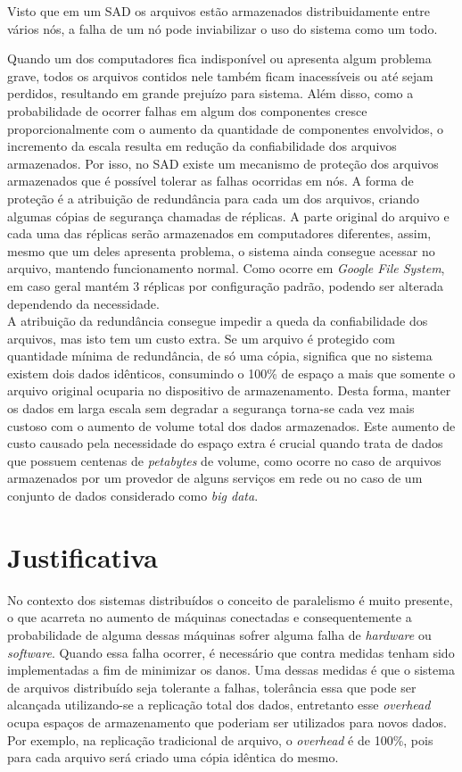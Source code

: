 	Visto que em um SAD os arquivos estão armazenados distribuidamente entre vários nós, a falha de um nó pode inviabilizar o uso do sistema como um todo.
	
	
	Quando um dos computadores fica indisponível ou apresenta algum problema grave, todos os arquivos contidos nele também ficam inacessíveis ou até sejam perdidos, resultando em grande prejuízo para sistema.
	Além disso, como a probabilidade de ocorrer falhas em algum dos componentes cresce proporcionalmente com o aumento da quantidade de componentes envolvidos, o incremento da escala resulta em redução da confiabilidade dos arquivos armazenados.
	Por isso, no SAD existe um mecanismo de proteção dos arquivos armazenados que é possível tolerar as falhas ocorridas em nós.
	A forma de proteção é a atribuição de redundância para cada um dos arquivos, criando algumas cópias de segurança chamadas de réplicas.
	A parte original do arquivo e cada uma das réplicas serão armazenados em computadores diferentes, assim, mesmo que um deles apresenta problema, o sistema ainda consegue acessar no arquivo, mantendo funcionamento normal.
	Como ocorre em \textit{Google File System}, em caso geral mantém 3 réplicas por configuração padrão, podendo ser alterada dependendo da necessidade.
	\\
	
A atribuição da redundância consegue impedir a queda da confiabilidade dos arquivos, mas isto tem um custo extra.
Se um arquivo é protegido com quantidade mínima de redundância, de só uma cópia, significa que no sistema existem dois dados idênticos, consumindo o 100\% de espaço a mais que somente o arquivo original ocuparia no dispositivo de armazenamento. 
Desta forma, manter os dados em larga escala sem degradar a segurança torna-se cada vez mais custoso com o aumento de volume total dos dados armazenados. 
Este aumento de custo causado pela necessidade do espaço extra é crucial quando trata de dados que possuem centenas de \textit{petabytes} de volume, como ocorre no caso de arquivos armazenados por um provedor de alguns serviços em rede ou no caso de um conjunto de dados considerado como \textit{big data}. \\

	
	\section{Justificativa}
	No contexto dos sistemas distribuídos o conceito de paralelismo é muito presente, o que acarreta no aumento de máquinas conectadas e consequentemente a probabilidade de alguma dessas máquinas sofrer alguma falha de \textit{hardware} ou \textit{software}. Quando essa falha ocorrer, é necessário que contra medidas tenham sido implementadas a fim de minimizar os danos. Uma dessas medidas é que o sistema de arquivos distribuído seja tolerante a falhas, tolerância essa que pode ser alcançada utilizando-se a replicação total dos dados, entretanto esse \textit{overhead} ocupa espaços de armazenamento que poderiam ser utilizados para novos dados. Por exemplo, na replicação tradicional de arquivo, o \textit{overhead} é de 100\%, pois para cada arquivo será criado uma cópia idêntica do mesmo.
	\\
	
